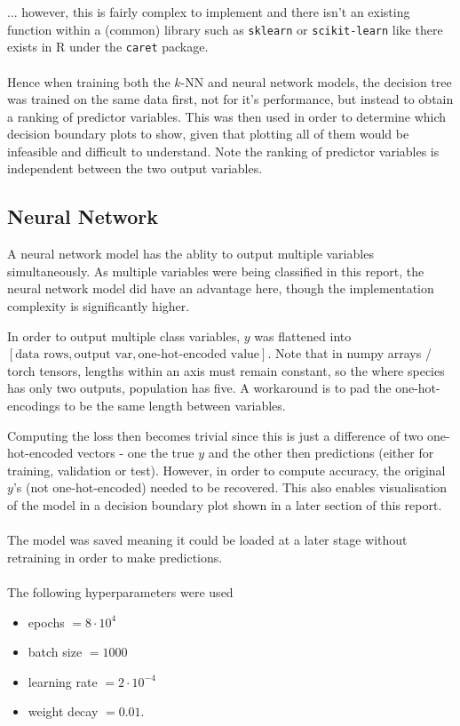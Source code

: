 \documentclass{article}
\begin{document}
... however, this is fairly complex to implement and there isn't an existing function within a (common) library such as \texttt{sklearn} or \texttt{scikit-learn} like there exists in R under the \texttt{caret} package. \\
\\
Hence when training both the $k$-NN and neural network models, the decision tree was trained on the same data first, not for it's performance, but instead to obtain a ranking of predictor variables. This was then used in order to determine which decision boundary plots to show, given that plotting all of them would be infeasible and difficult to understand. Note the ranking of predictor variables is independent between the two output variables.

\newpage
\subsection{Neural Network}

A neural network model has the ablity to output multiple variables simultaneously. As multiple variables were being classified in this report, the neural network model did have an advantage here, though the implementation complexity is significantly higher. 

In order to output multiple class variables, $y$ was flattened into $\left[\text{data rows}, \text{output var}, \text{one-hot-encoded value}\right]$. Note that in numpy arrays / torch tensors, lengths within an axis must remain constant, so the where species has only two outputs, population has five. A workaround is to pad the one-hot-encodings to be the same length between variables. 

Computing the loss then becomes trivial since this is just a difference of two one-hot-encoded vectors - one the true $y$ and the other then predictions (either for training, validation or test). However, in order to compute accuracy, the original $y$'s (not one-hot-encoded) needed to be recovered. This also enables visualisation of the model in a decision boundary plot shown in a later section of this report. \\
\\
The model was saved meaning it could be loaded at a later stage without retraining in order to make predictions. \\
\\
The following hyperparameters were used
\begin{itemize}
    \item epochs $= 8 \cdot 10^4$
    \item batch size $= 1000$
    \item learning rate $= 2 \cdot 10^{-4}$
    \item weight decay $= 0.01$.
\end{itemize}
\end{document}
